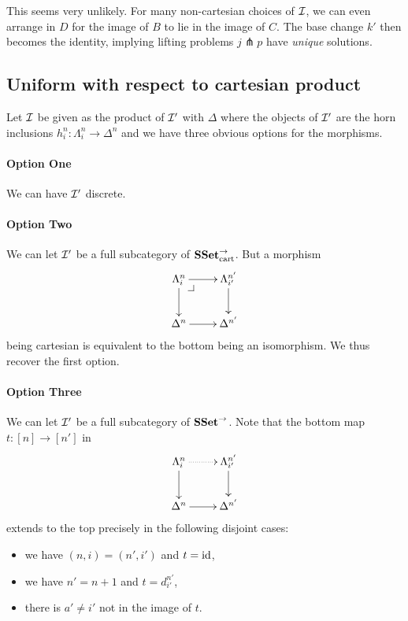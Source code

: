 \documentclass[reqno,10pt,a4paper,oneside]{amsart}
\begin{document}
This seems very unlikely.
For many non-cartesian choices of $\cal{I}$, we can even arrange in $D$ for the image of $B$ to lie in the image of $C$.
The base change $k'$ then becomes the identity, implying lifting problems $j \pitchfork p$ have \emph{unique} solutions.

\subsection*{Uniform with respect to cartesian product}

Let $\cal{I}$ be given as the product of $\cal{I'}$ with $\Delta$ where the objects of $\cal{I'}$ are the horn inclusions $h_i^n : \Lambda_i^n \to \Delta^n$ and we have three obvious options for the morphisms.

\paragraph{Option One}

We can have $\cal{I'}$ discrete.

\paragraph{Option Two}

We can let $\cal{I'}$ be a full subcategory of $\SSet_{\text{cart}}^{\to}$.
But a morphism
\[
\xymatrix{
  \Lambda_i^n
  \ar[r]
  \ar[d]
  \pullback{dr}
&
  \Lambda_{i'}^{n'}
  \ar[d]
\\
  \Delta^n
  \ar[r]
&
  \Delta^{n'}
}
\]
being cartesian is equivalent to the bottom being an isomorphism.
We thus recover the first option.

\paragraph{Option Three}

We can let $\cal{I'}$ be a full subcategory of $\SSet^{\to}$.
Note that the bottom map $t : [n] \to [n']$ in
\[
\xymatrix{
  \Lambda_i^n
  \ar@{.>}[r]
  \ar[d]
&
  \Lambda_{i'}^{n'}
  \ar[d]
\\
  \Delta^n
  \ar[r]
&
  \Delta^{n'}
}
\]
extends to the top precisely in the following disjoint cases:
\begin{itemize}
\item
we have $(n, i) = (n', i')$ and $t = \id$,
\item
we have $n' = n + 1$ and $t = d_{i'}^{n'}$,
\item
there is $a' \neq i'$ not in the image of $t$.
\end{itemize}
\end{document}
